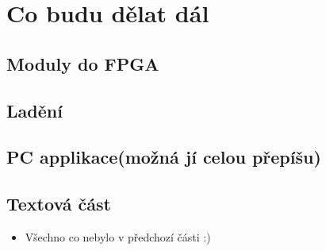 \documentclass{beamer}
\begin{document}
\section{Co budu dělat dál}

\subsection{Moduly do FPGA}
\subsection{Ladění}
\subsection{PC applikace(možná jí celou přepíšu)}
\subsection{Textová část}
\begin{frame}{}
	\begin{itemize}
		\item Všechno co nebylo v předchozí části :)
		\end{itemize}
	\end{frame}
\end{document}
